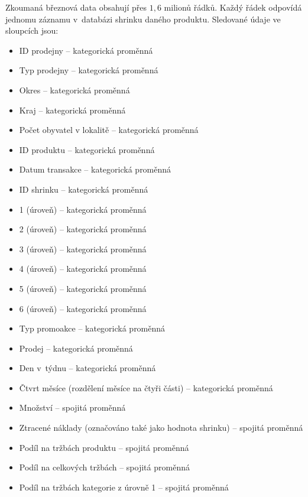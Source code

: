
Zkoumaná březnová data obsahují přes $1{,6}$ milionů řádků.
Každý řádek odpovídá jednomu záznamu v~databázi shrinku daného produktu. Sledované údaje ve sloupcích jsou: 
\begin{itemize}
    \itemsep-0.34em
    \item ID prodejny -- kategorická proměnná
    \item Typ prodejny -- kategorická proměnná
    \item Okres -- kategorická proměnná
    \item Kraj -- kategorická proměnná
    \item Počet obyvatel v lokalitě -- kategorická proměnná
    \item ID produktu -- kategorická proměnná
    \item Datum transakce -- kategorická proměnná
    \item ID shrinku -- kategorická proměnná
    \item 1 (úroveň) -- kategorická proměnná
    \item 2 (úroveň) -- kategorická proměnná
    \item 3 (úroveň) -- kategorická proměnná
    \item 4 (úroveň) -- kategorická proměnná
    \item 5 (úroveň) -- kategorická proměnná
    \item 6 (úroveň) -- kategorická proměnná
    \item Typ promoakce -- kategorická proměnná
    \item Prodej -- kategorická proměnná
    \item Den v~týdnu -- kategorická proměnná
    \item Čtvrt měsíce (rozdělení měsíce na čtyři části) -- kategorická proměnná
    \item Množství -- spojitá proměnná
    \item Ztracené náklady (označováno také jako hodnota shrinku) -- spojitá proměnná
    \item Podíl na tržbách produktu -- spojitá proměnná
    \item Podíl na celkových tržbách -- spojitá proměnná
    \item Podíl na tržbách kategorie z úrovně 1 -- spojitá proměnná
\end{itemize}
